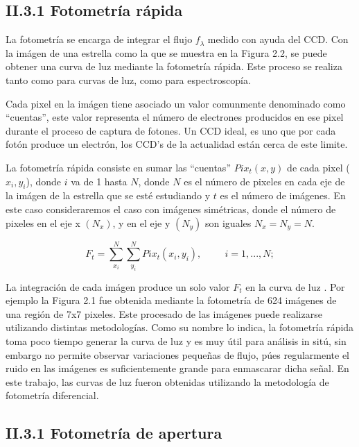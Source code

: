 \subsection*{II.3.1 Fotometría rápida}

La fotometría se encarga de integrar el flujo $f_{\lambda}$ medido con ayuda del CCD. Con la imágen de una estrella como la que se muestra en la Figura 2.2, se puede obtener una curva de luz mediante la fotometría rápida. Este proceso se realiza tanto como para curvas de luz, como para espectroscopía.

Cada pixel en la imágen tiene asociado un valor comunmente denominado como ``cuentas'', este valor representa el número de electrones producidos en ese pixel durante el proceso de captura de fotones. Un CCD ideal, es uno que por cada fotón produce un electrón, los CCD's de la actualidad están cerca de este limite.

La fotometría rápida consiste en sumar las ``cuentas'' $Pix_{t}(x,y) $ de cada pixel ($x_{i},y_{i}$), donde $ i $ va de 1 hasta $ N $, donde $ N $ es el número de pixeles en cada eje de la imágen de la estrella que se esté estudiando y $ t $ es el número de imágenes. En este caso consideraremos el caso con imágenes simétricas, donde el número de pixeles en el eje x $(N_{x})$, y en el eje y $(N_{y})$ son iguales $N_{x}=N_{y}=N$. 

\begin{equation}
  \displaystyle F_{t} = \sum_{x_{i}}^{N} \sum_{y_{i}}^{N} Pix_{t}(x_{i},y_{i}),\hspace{1cm}i=1,...,N;
\end{equation}

La integración de cada imágen produce un solo valor $F_{t}$ en la curva de luz \cite{romanishin2006introduction}. Por ejemplo la Figura 2.1 fue obtenida mediante la fotometría de 624 imágenes de una región de 7x7 pixeles. Este procesado de las imágenes puede realizarse utilizando distintas metodologías. Como su nombre lo indica, la fotometría rápida toma poco tiempo generar la curva de luz y es muy útil para análisis in sitú, sin embargo no permite observar variaciones pequeñas de flujo, púes regularmente el ruido en las imágenes es suficientemente grande para enmascarar dicha señal. En este trabajo, las curvas de luz fueron obtenidas utilizando la metodología de fotometría diferencial.

\subsection*{II.3.1 Fotometría de apertura}

